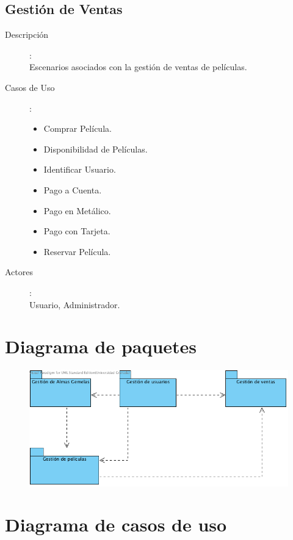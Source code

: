 \documentclass{article}
\begin{document}
\subsection*{Gestión de Ventas}
	\begin{description}
	\item[Descripción]:\\ Escenarios asociados con la gestión de ventas de películas.
	\item[Casos de Uso]:
	\begin{itemize}
		\item Comprar Película. %
		\item Disponibilidad de Películas. %
		\item Identificar Usuario.						
		\item Pago a Cuenta.
		\item Pago en Metálico.
		\item Pago con Tarjeta.
		\item Reservar Película.
	\end{itemize}	
	\item[Actores]:\\ Usuario, Administrador.
	\end{description}
	
\section{Diagrama de paquetes}
	\begin{figure}[h]
		\begin{center}
   			\includegraphics[scale=0.75]{Paquetes.png}
 	  	\end{center}
 	 \end{figure}

\pagebreak

\section{Diagrama de casos de uso}
\end{document}

